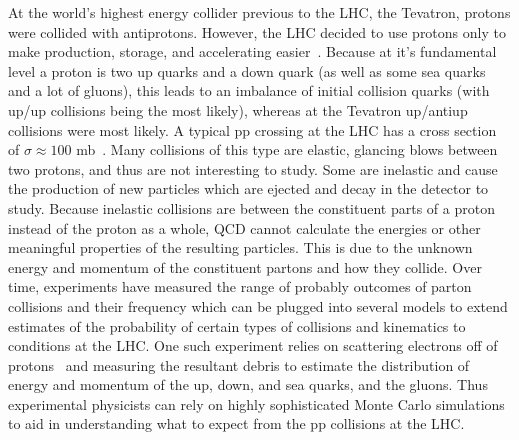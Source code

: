 At the world's highest energy collider previous to the LHC, the Tevatron, protons were collided with antiprotons. However, the LHC decided to use protons only to make production, storage, and accelerating easier~\cite{lhcmachine}. Because at it's fundamental level a proton is two up quarks and a down quark (as well as some sea quarks and a lot of gluons), this leads to an imbalance of initial collision quarks (with up/up collisions being the most likely), whereas at the Tevatron up/antiup collisions were most likely. A typical pp crossing at the LHC has a cross section of $\sigma \approx 100$ mb~\cite{qcdprimer}. Many collisions of this type are elastic, glancing blows between two protons, and thus are not interesting to study. Some are inelastic and cause the production of new particles which are ejected and decay in the detector to study. Because inelastic collisions are between the constituent parts of a proton instead of the proton as a whole, QCD cannot calculate the energies or other meaningful properties of the resulting particles. This is due to the unknown energy and momentum of the constituent partons and how they collide. Over time, experiments have measured the range of probably outcomes of parton collisions and their frequency which can be plugged into several models to extend estimates of the probability of certain types of collisions and kinematics to conditions at the LHC. One such experiment relies on scattering electrons off of protons~\cite{halzen} and measuring the resultant debris to estimate the distribution of energy and momentum of the up, down, and sea quarks, and the gluons. Thus experimental physicists can rely on highly sophisticated Monte Carlo simulations to aid in understanding what to expect from the pp collisions at the LHC.



